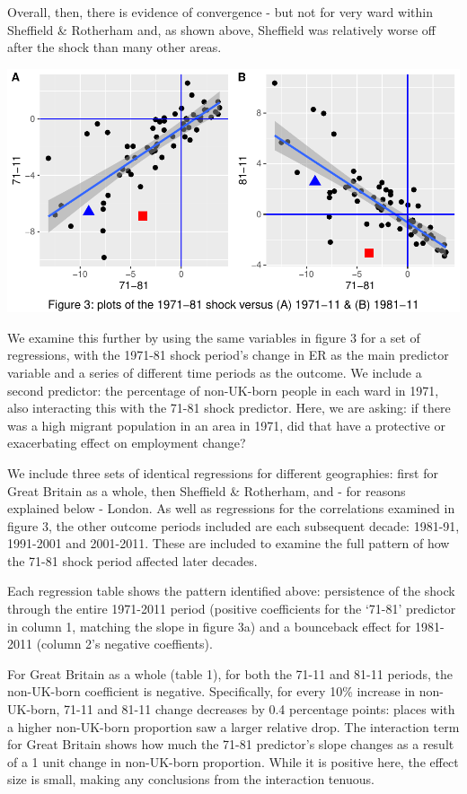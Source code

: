 \documentclass[
]{article}
\begin{document}
Overall, then, there is evidence of convergence - but not for very ward
within Sheffield \& Rotherham and, as shown above, Sheffield was
relatively worse off after the shock than many other areas.

\includegraphics{SheffieldScarring_Writeup1_Apr2022_files/figure-latex/unnamed-chunk-4-1.pdf}

We examine this further by using the same variables in figure 3 for a
set of regressions, with the 1971-81 shock period's change in ER as the
main predictor variable and a series of different time periods as the
outcome. We include a second predictor: the percentage of non-UK-born
people in each ward in 1971, also interacting this with the 71-81 shock
predictor. Here, we are asking: if there was a high migrant population
in an area in 1971, did that have a protective or exacerbating effect on
employment change?

We include three sets of identical regressions for different
geographies: first for Great Britain as a whole, then Sheffield \&
Rotherham, and - for reasons explained below - London. As well as
regressions for the correlations examined in figure 3, the other outcome
periods included are each subsequent decade: 1981-91, 1991-2001 and
2001-2011. These are included to examine the full pattern of how the
71-81 shock period affected later decades.

Each regression table shows the pattern identified above: persistence of
the shock through the entire 1971-2011 period (positive coefficients for
the `71-81' predictor in column 1, matching the slope in figure 3a) and
a bounceback effect for 1981-2011 (column 2's negative coeffients).

For Great Britain as a whole (table 1), for both the 71-11 and 81-11
periods, the non-UK-born coefficient is negative. Specifically, for
every 10\% increase in non-UK-born, 71-11 and 81-11 change decreases by
0.4 percentage points: places with a higher non-UK-born proportion saw a
larger relative drop. The interaction term for Great Britain shows how
much the 71-81 predictor's slope changes as a result of a 1 unit change
in non-UK-born proportion. While it is positive here, the effect size is
small, making any conclusions from the interaction tenuous.
\end{document}
